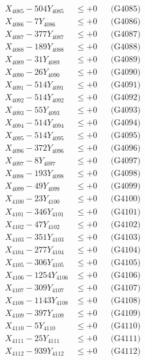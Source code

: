\documentclass[a4paper,10pt]{article}
\begin{document}
{\begin{align}
X_{4085} - 504Y_{4085} &\leq +0 && \text{(G4085)} \\
X_{4086} - 7Y_{4086} &\leq +0 && \text{(G4086)} \\
X_{4087} - 377Y_{4087} &\leq +0 && \text{(G4087)} \\
X_{4088} - 189Y_{4088} &\leq +0 && \text{(G4088)} \\
X_{4089} - 31Y_{4089} &\leq +0 && \text{(G4089)} \\
X_{4090} - 26Y_{4090} &\leq +0 && \text{(G4090)} \\
\allowbreak
X_{4091} - 514Y_{4091} &\leq +0 && \text{(G4091)} \\
X_{4092} - 514Y_{4092} &\leq +0 && \text{(G4092)} \\
X_{4093} - 55Y_{4093} &\leq +0 && \text{(G4093)} \\
X_{4094} - 514Y_{4094} &\leq +0 && \text{(G4094)} \\
X_{4095} - 514Y_{4095} &\leq +0 && \text{(G4095)} \\
X_{4096} - 372Y_{4096} &\leq +0 && \text{(G4096)} \\
X_{4097} - 8Y_{4097} &\leq +0 && \text{(G4097)} \\
X_{4098} - 193Y_{4098} &\leq +0 && \text{(G4098)} \\
X_{4099} - 49Y_{4099} &\leq +0 && \text{(G4099)} \\
X_{4100} - 23Y_{4100} &\leq +0 && \text{(G4100)} \\
\allowbreak
X_{4101} - 346Y_{4101} &\leq +0 && \text{(G4101)} \\
X_{4102} - 47Y_{4102} &\leq +0 && \text{(G4102)} \\
X_{4103} - 351Y_{4103} &\leq +0 && \text{(G4103)} \\
X_{4104} - 277Y_{4104} &\leq +0 && \text{(G4104)} \\
X_{4105} - 306Y_{4105} &\leq +0 && \text{(G4105)} \\
X_{4106} - 1254Y_{4106} &\leq +0 && \text{(G4106)} \\
X_{4107} - 309Y_{4107} &\leq +0 && \text{(G4107)} \\
X_{4108} - 1143Y_{4108} &\leq +0 && \text{(G4108)} \\
X_{4109} - 397Y_{4109} &\leq +0 && \text{(G4109)} \\
X_{4110} - 5Y_{4110} &\leq +0 && \text{(G4110)} \\
\allowbreak
X_{4111} - 25Y_{4111} &\leq +0 && \text{(G4111)} \\
X_{4112} - 939Y_{4112} &\leq +0 && \text{(G4112)} \\

\end{align}}
\end{document}
